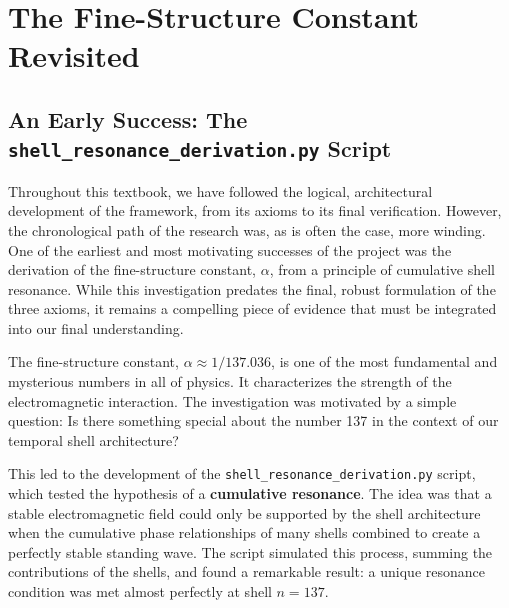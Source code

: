 \documentclass[12pt]{report}
\begin{document}
\chapter{The Fine-Structure Constant Revisited}

\section{An Early Success: The \texttt{shell\_resonance\_derivation.py} Script}
Throughout this textbook, we have followed the logical, architectural development of the framework, from its axioms to its final verification. However, the chronological path of the research was, as is often the case, more winding. One of the earliest and most motivating successes of the project was the derivation of the fine-structure constant, $\alpha$, from a principle of cumulative shell resonance. While this investigation predates the final, robust formulation of the three axioms, it remains a compelling piece of evidence that must be integrated into our final understanding.

The fine-structure constant, $\alpha \approx 1/137.036$, is one of the most fundamental and mysterious numbers in all of physics. It characterizes the strength of the electromagnetic interaction. The investigation was motivated by a simple question: Is there something special about the number 137 in the context of our temporal shell architecture?

This led to the development of the \texttt{shell\_resonance\_derivation.py} script, which tested the hypothesis of a \textbf{cumulative resonance}. The idea was that a stable electromagnetic field could only be supported by the shell architecture when the cumulative phase relationships of many shells combined to create a perfectly stable standing wave. The script simulated this process, summing the contributions of the shells, and found a remarkable result: a unique resonance condition was met almost perfectly at shell $n=137$.
\end{document}
